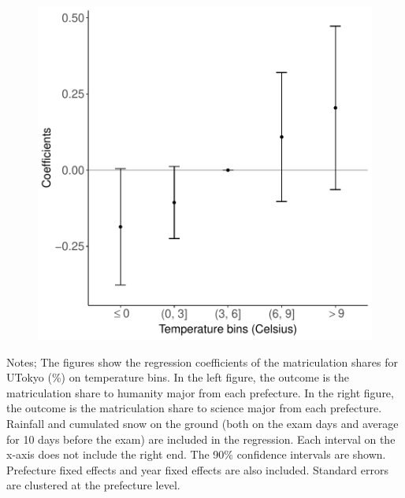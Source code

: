 \documentclass[10pt, pdfmx,hiresbb]{beamer}
\begin{document}
\begin{frame}
\begin{minipage}{0.49\textwidth}
\begin{figure}[h]
      \includegraphics[width = \textwidth]{../Output/images/reg_major_4.pdf}
      \centering
    \end{figure}
  \end{minipage}
  \tiny
  \begin{tablenotes}
  \item Notes;
    The figures show the regression coefficients of the matriculation shares for UTokyo (\%) on temperature bins.
    In the left figure, the outcome is the matriculation share to humanity major from each prefecture.
    In the right figure, the outcome is the matriculation share to science major from each prefecture.
    Rainfall and cumulated snow on the ground (both on the exam days and average for 10 days before the exam) are included in the regression.
    Each interval on the x-axis does not include the right end.
    The 90\% confidence intervals are shown.
    Prefecture fixed effects and year fixed effects are also included.
    Standard errors are clustered at the prefecture level.
  \end{tablenotes}
\end{frame}
\end{document}
